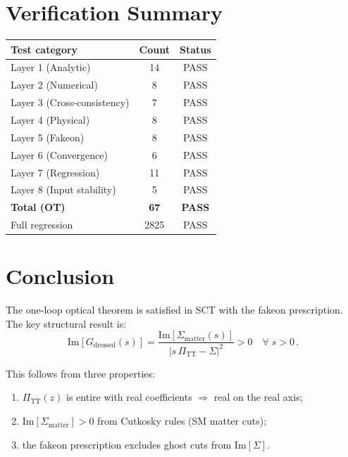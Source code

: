 \documentclass[11pt,a4paper]{article}
\newcommand{\PiTT}{\Pi_{\mathrm{TT}}}
\newcommand{\Imag}{\mathrm{Im}}
\begin{document}
\section{Verification Summary}

\begin{center}
\renewcommand{\arraystretch}{1.3}
\begin{tabular}{lcc}
  \toprule
  Test category & Count & Status \\
  \midrule
  Layer 1 (Analytic) & 14 & PASS \\
  Layer 2 (Numerical) & 8 & PASS \\
  Layer 3 (Cross-consistency) & 7 & PASS \\
  Layer 4 (Physical) & 8 & PASS \\
  Layer 5 (Fakeon) & 8 & PASS \\
  Layer 6 (Convergence) & 6 & PASS \\
  Layer 7 (Regression) & 11 & PASS \\
  Layer 8 (Input stability) & 5 & PASS \\
  \midrule
  \textbf{Total (OT)} & \textbf{67} & \textbf{PASS} \\
  \midrule
  Full regression & 2825 & PASS \\
  \bottomrule
\end{tabular}
\end{center}


\section{Conclusion}

The one-loop optical theorem is satisfied in SCT with the fakeon prescription.
The key structural result is:
\begin{equation}
  \Imag[G_{\mathrm{dressed}}(s)]
  = \frac{\Imag[\Sigma_{\mathrm{matter}}(s)]}{|s\,\PiTT - \Sigma|^2} > 0
  \quad\forall\; s > 0\,.
\end{equation}

This follows from three properties:
\begin{enumerate}[nosep]
  \item $\PiTT(z)$ is entire with real coefficients $\Rightarrow$ real on the
        real axis;
  \item $\Imag[\Sigma_{\mathrm{matter}}] > 0$ from Cutkosky rules (SM matter cuts);
  \item the fakeon prescription excludes ghost cuts from $\Imag[\Sigma]$.
\end{enumerate}
\end{document}
